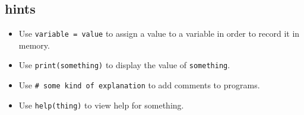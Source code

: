 \documentclass[
  letterpaper,
  DIV=11,
  numbers=noendperiod]{scrartcl}
\providecommand{\tightlist}{%
  \setlength{\itemsep}{0pt}\setlength{\parskip}{0pt}}
\begin{document}
\subsection{hints}\label{hints-1}

\begin{itemize}
\tightlist
\item
  Use \texttt{variable\ =\ value} to assign a value to a variable in
  order to record it in memory.
\item
  Use \texttt{print(something)} to display the value of
  \texttt{something}.
\item
  Use \texttt{\#\ some\ kind\ of\ explanation} to add comments to
  programs.
\item
  Use \texttt{help(thing)} to view help for something.
\end{itemize}
\end{document}
